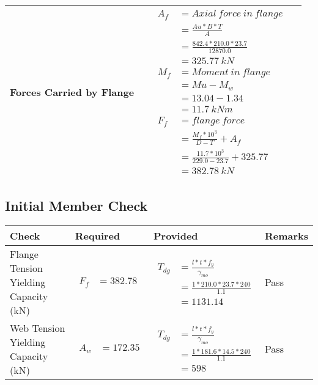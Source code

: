 \documentclass{article}%
\begin{document}
\begin{longtable}{|p{4cm}|p{3.5cm}|p{6.5cm}|p{1.5cm}|}
\hline%
Forces Carried by Flange&&$\begin{aligned} A_f&= Axial~force~ in ~flange  \\ &= \frac{Au * B *T}{A} \\ &= \frac{842.4 * 210.0*23.7}{12870.0} \\ &=325.77~ kN\\ M_f& =Moment~ in~ flange \\  & = Mu-M_w\\ &= 13.04-1.34\\ &=11.7~{kNm}\\  F_f& =flange~force  \\ & = \frac{M_f *10^3}{D-T} + A_f \\ &= \frac{11.7* 10^3}{229.0-23.7} +325.77 \\ &=382.78~kN \end{aligned}$&\\%
\hline%
\end{longtable}

%
\newpage%
\subsection{Initial Member Check}%
\label{subsec:InitialMemberCheck}%
\renewcommand{\arraystretch}{1.2}%
\begin{longtable}{|p{3cm}|p{4.5cm}|p{6.5cm}|p{1.5cm}|}%
\hline%
\rowcolor{OsdagGreen}%
Check&Required&Provided&Remarks\\%
\hline%
\endhead%
\hline%
Flange Tension Yielding Capacity (kN)&$\begin{aligned} F_f &=382.78\end{aligned}$&$\begin{aligned} T_{dg} &= \frac{l*t*f_y}{\gamma_{mo}}\\ &=\frac{1*210.0*23.7*240}{1.1}\\ &=1131.14\end{aligned}$&Pass\\%
\hline%
Web Tension Yielding Capacity (kN)&$\begin{aligned} A_w &=172.35\end{aligned}$&$\begin{aligned} T_{dg} &= \frac{l*t*f_y}{\gamma_{mo}}\\ &=\frac{1*181.6*14.5*240}{1.1}\\ &=598\end{aligned}$&Pass\\%
\hline%
\end{longtable}
\end{document}
